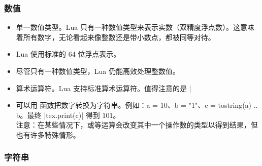 \subsubsection{数值}


\begin{itemize}
  \item 单一数值类型。Lua 只有一种数值类型来表示实数（双精度浮点数）。这意味着所有数字，无论看起来像整数还是带小数点，都被同等对待。

\item Lua 使用标准的 64 位浮点表示。
\item 尽管只有一种数值类型，Lua 仍能高效处理整数值。

\item  算术运算符。Lua 支持标准算术运算符。值得注意的是 |%

\item 可以用  函数把数字转换为字符串。例如：a = 10、b = "1"、c = tostring(a) .. b。最终 |tex.print(c)| 得到 $101$。\\ 注意：在某些情况下，或等运算会改变其中一个操作数的类型以得到结果，但也有许多特殊情形。

\end{itemize}

\subsubsection{字符串}


